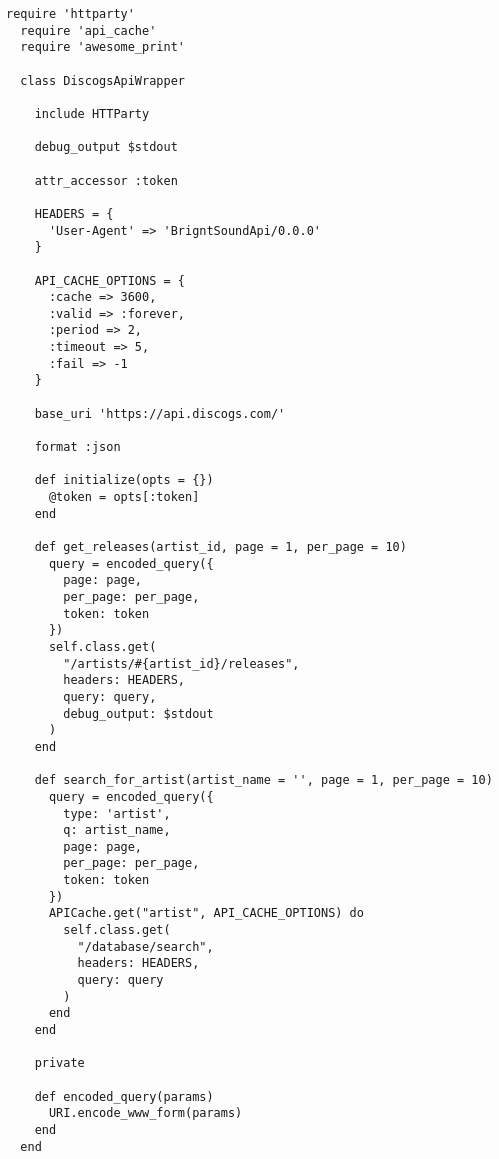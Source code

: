 \begin{lstlisting}[style=fsharpstyle,caption={Пример получения артистов по определённым параметрам}, label=lst:arch_and_mod:mvc:controller:cancancan_example]
  require 'httparty'
  require 'api_cache'
  require 'awesome_print'

  class DiscogsApiWrapper

    include HTTParty

    debug_output $stdout

    attr_accessor :token

    HEADERS = {
      'User-Agent' => 'BrigntSoundApi/0.0.0'
    }

    API_CACHE_OPTIONS = {
      :cache => 3600,
      :valid => :forever,
      :period => 2,
      :timeout => 5,
      :fail => -1
    }

    base_uri 'https://api.discogs.com/'

    format :json

    def initialize(opts = {})
      @token = opts[:token]
    end

    def get_releases(artist_id, page = 1, per_page = 10)
      query = encoded_query({
        page: page,
        per_page: per_page,
        token: token
      })
      self.class.get(
        "/artists/#{artist_id}/releases",
        headers: HEADERS,
        query: query,
        debug_output: $stdout
      )
    end

    def search_for_artist(artist_name = '', page = 1, per_page = 10)
      query = encoded_query({
        type: 'artist',
        q: artist_name,
        page: page,
        per_page: per_page,
        token: token
      })
      APICache.get("artist", API_CACHE_OPTIONS) do
        self.class.get(
          "/database/search",
          headers: HEADERS,
          query: query
        )
      end
    end

    private

    def encoded_query(params)
      URI.encode_www_form(params)
    end
  end

\end{lstlisting}
